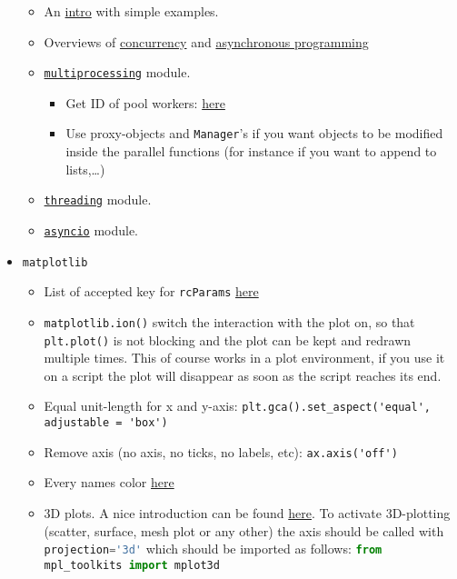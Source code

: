 \documentclass[a4paper,12pt,%
              final%
              ]{article}
\begin{document}
\begin{itemize}
    \begin{itemize}
      \item An \href{https://www.machinelearningplus.com/python/parallel-processing-python/}{intro} with simple examples.
      \item Overviews of \href{https://realpython.com/python-concurrency/}{concurrency} and \href{https://realpython.com/async-io-python/}{asynchronous programming}
      \item \href{https://docs.python.org/3/library/multiprocessing.html}{\texttt{multiprocessing}} module.
        \begin{itemize}
          \item Get ID of pool workers: \href{https://stackoverflow.com/questions/10190981/get-a-unique-id-for-worker-in-python-multiprocessing-pool}{here}
          \item Use proxy-objects and \texttt{Manager}'s if you want objects to be modified inside the parallel functions (for instance if you want to append to lists,\ldots)
        \end{itemize}
      \item \href{https://docs.python.org/3/library/threading.html}{\texttt{threading}} module.
      \item \href{https://docs.python.org/3/library/asyncio.html}{\texttt{asyncio}} module.
    \end{itemize}
  \item \texttt{matplotlib}
    \begin{itemize}
      \item List of accepted key for \texttt{rcParams} \href{https://matplotlib.org/stable/api/matplotlib_configuration_api.html#matplotlib.rcParams}{here}
      \item \texttt{matplotlib.ion()} switch the interaction with the plot on, so that \texttt{plt.plot()} is not blocking and the plot can be kept and redrawn multiple times. This of course works in a plot environment, if you use it on a script the plot will disappear as soon as the script reaches its end.
      \item Equal unit-length for x and y-axis: \verb|plt.gca().set_aspect('equal', adjustable = 'box')|
      \item Remove axis (no axis, no ticks, no labels, etc): \verb|ax.axis('off')|
      \item Every names color \href{https://matplotlib.org/stable/gallery/color/named_colors.html}{here}
      \item 3D plots. A nice introduction can be found \href{https://jakevdp.github.io/PythonDataScienceHandbook/04.12-three-dimensional-plotting.html}{here}. To activate 3D-plotting (scatter, surface, mesh plot or any other) the axis should be called with \lstinline[language=python]{projection='3d'} which should be imported as follows: \lstinline[language=python]{from mpl_toolkits import mplot3d}

\end{itemize}
\end{itemize}
\end{document}

